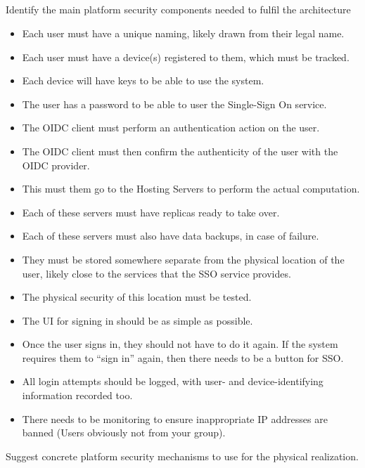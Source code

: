 \begin{questions}
\begin{parts}
  \part{} Identify the main platform security components needed to fulfil the architecture
    \begin{solution}
      \begin{itemize}[noitemsep]
      \item Each user must have a unique naming, likely drawn from their legal name.
      \item Each user must have a device(s) registered to them, which must be tracked.
      \item Each device will have keys to be able to use the system.
      \item The user has a password to be able to user the Single-Sign On service.
      \item The OIDC client must perform an authentication action on the user.
      \item The OIDC client must then confirm the authenticity of the user with the OIDC provider.
      \item This must them go to the Hosting Servers to perform the actual computation.
      \item Each of these servers must have replicas ready to take over.
      \item Each of these servers must also have data backups, in case of failure.
      \item They must be stored somewhere separate from the physical location of the user, likely close to the services that the SSO service provides.
      \item The physical security of this location must be tested.
      \item The UI for signing in should be as simple as possible.
      \item Once the user signs in, they should not have to do it again. If the system requires them to ``sign in'' again, then there needs to be a button for SSO.\@
      \item All login attempts should be logged, with user- and device-identifying information recorded too.
      \item There needs to be monitoring to ensure inappropriate IP addresses are banned (Users obviously not from your group).
      \end{itemize}
    \end{solution}

    \begin{subparts}
    \subpart{} Suggest concrete platform security mechanisms to use for the physical realization.
    \end{subparts}
  \end{parts}
\end{questions}

